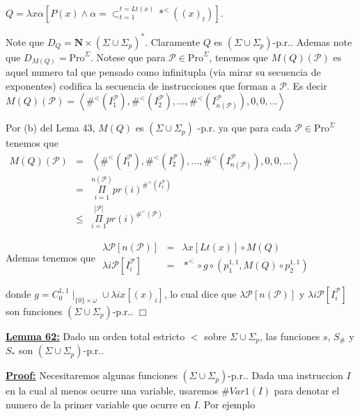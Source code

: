 \(\displaystyle Q=\lambda x\alpha \left[ P(x)\wedge \alpha =\subset _{t=1}^{t=Lt(x)}\ast ^{< }((x)_{t})\right] \text{.} \)

Note que \(D_{Q}=\mathbf{N}\times (\Sigma \cup \Sigma _{p})^{\ast }\). Claramente \(Q\) es \((\Sigma \cup \Sigma _{p})\)-p.r.. Ademas note que \( D_{M(Q)}=\mathrm{Pro}^{\Sigma }\). Notese que para \(\mathcal{P}\in \mathrm{Pro }^{\Sigma }\), tenemos que \(M(Q)(\mathcal{P})\) es aquel numero tal que pensado como infinitupla (via mirar su secuencia de exponentes) codifica la secuencia de instrucciones que forman a \(\mathcal{P}\). Es decir
\(\displaystyle M(Q)(\mathcal{P})=\left\langle \#^{< }(I_{1}^{\mathcal{P}}),\#^{< }(I_{2}^{ \mathcal{P}}),...,\#^{< }(I_{n(\mathcal{P})}^{\mathcal{P}}),0,0,...\right \rangle \)

Por (b) del Lema 43, \(M(Q)\) es \((\Sigma \cup \Sigma _{p})\) -p.r. ya que para cada \(\mathcal{P}\in \mathrm{Pro}^{\Sigma }\) tenemos que
\(\displaystyle \begin{array}{rcl} M(Q)(\mathcal{P}) & =& \left\langle \#^{< }(I_{1}^{\mathcal{P}}),\#^{< }(I_{2}^{ \mathcal{P}}),...,\#^{< }(I_{n(\mathcal{P})}^{\mathcal{P}}),0,0,...\right \rangle \\ & =& \underset{i=1}{\overset{n(\mathcal{P})}{\Pi }}pr(i)^{\#^{< }(I_{1}^{ \mathcal{P}})} \\ & \leq & \underset{i=1}{\overset{\left\vert \mathcal{P}\right\vert }{\Pi }} pr(i)^{\#^{< }(\mathcal{P})} \end{array} \)

Ademas tenemos que
\(\displaystyle \begin{array}{rcl} \lambda \mathcal{P}\left[ n(\mathcal{P})\right] & =& \lambda x\left[ Lt(x) \right] \circ M(Q) \\ \lambda i\mathcal{P}\left[ I_{i}^{\mathcal{P}}\right] & =& \ast ^{< }\circ g\circ \left( p_{1}^{1,1},M(Q)\circ p_{2}^{1,1}\right) \end{array} \)

donde \(g=C_{0}^{1,1}\mid _{\{0\}\times \omega }\cup \lambda ix\left[ (x)_{i} \right] \), lo cual dice que \(\lambda \mathcal{P}\left[ n(\mathcal{P})\right] \) y \(\lambda i\mathcal{P}\left[ I_{i}^{\mathcal{P}}\right] \) son funciones \( (\Sigma \cup \Sigma _{p})\)-p.r.. \(\Box\)


\textbf{\underline{Lemma 62:}} Dado un orden total estricto \( < \) sobre \(\Sigma \cup \Sigma _{p}\), las funciones \(s\), \(S_{\#}\) y \(S_{\ast } \) son \((\Sigma \cup \Sigma _{p})\)-p.r..

\textbf{\underline{Proof:}} Necesitaremos algunas funciones \((\Sigma \cup \Sigma _{p})\)-p.r.. Dada una instruccion \(I\) en la cual al menos ocurre una variable, usaremos \(\#Var1(I)\) para denotar el numero de la primer variable que ocurre en \(I\). Por ejemplo

